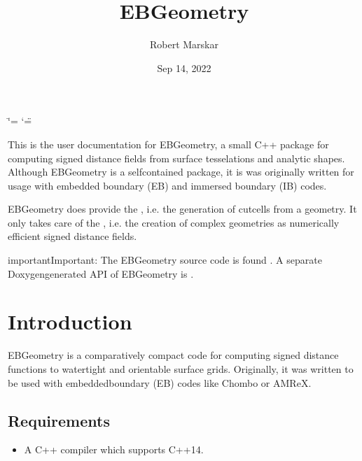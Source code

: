 \documentclass[letterpaper,10pt,english]{sphinxmanual}
\title{EBGeometry}
\date{Sep 14, 2022}
\author{Robert Marskar}
\begin{document}
\ifdefined\shorthandoff
  \ifnum\catcode`\=\string=\active\shorthandoff{=}\fi
  \ifnum\catcode`\"=\active{}\fi
\fi

\pagestyle{empty}
\sphinxmaketitle
\pagestyle{plain}
\sphinxtableofcontents
\pagestyle{normal}
\label{\detokenize{index::doc}}


\sphinxAtStartPar
This is the user documentation for EBGeometry, a small C++ package for computing signed distance fields from surface tesselations and analytic shapes.
Although EBGeometry is a self\sphinxhyphen{}contained package, it is was originally written for usage with embedded boundary (EB) and immersed boundary (IB) codes.

\sphinxAtStartPar
EBGeometry does provide the , i.e. the generation of cut\sphinxhyphen{}cells from a geometry.
It only takes care of the , i.e. the creation of complex geometries as numerically efficient signed distance fields.

\begin{sphinxadmonition}{important}{Important:}
\sphinxAtStartPar
The EBGeometry source code is found .
A separate Doxygen\sphinxhyphen{}generated API of EBGeometry is .
\end{sphinxadmonition}




\chapter{Introduction}
\label{\detokenize{index:introduction}}
\sphinxstepscope
{}\label{\detokenize{Introduction:chap-introduction}}
\sphinxAtStartPar
EBGeometry is a comparatively compact code for computing signed distance functions to watertight and orientable surface grids.
Originally, it was written to be used with embedded\sphinxhyphen{}boundary (EB) codes like Chombo or AMReX.


\section{Requirements}
\label{\detokenize{Introduction:requirements}}\label{\detokenize{Introduction::doc}}\begin{itemize}
\item {} 
\sphinxAtStartPar
A C++ compiler which supports C++14.

\end{itemize}
\end{document}
